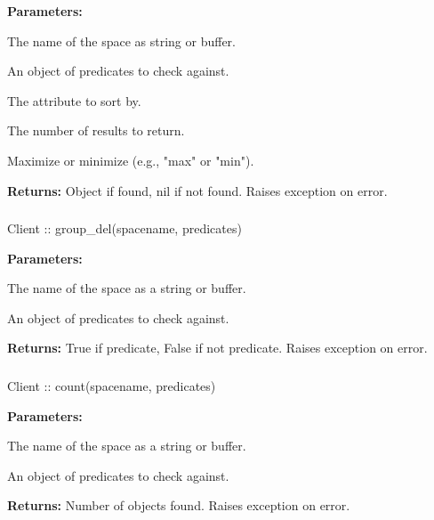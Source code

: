 \noindent\textbf{Parameters:}
\begin{description}[labelindent=\widthof{{\code{predicates}}},leftmargin=*,noitemsep,nolistsep,align=right]
\item[\code{spacename}] The name of the space as string or buffer.
\item[\code{predicates}] An object of predicates to check against.
\item[\code{sortby}] The attribute to sort by.
\item[\code{limit}] The number of results to return.
\item[\code{maxmin}] Maximize or minimize (e.g., "max" or "min").
\end{description}

\noindent\textbf{Returns:}
Object if found, nil if not found.  Raises exception on error.

\subsubsection{}
\label{api:nodejs:group_del}
\begin{javascriptcode}
Client :: group_del(spacename, predicates)
\end{javascriptcode}


\noindent\textbf{Parameters:}
\begin{description}[labelindent=\widthof{{\code{predicates}}},leftmargin=*,noitemsep,nolistsep,align=right]
\item[\code{spacename}] The name of the space as a string or buffer.
\item[\code{predicates}] An object of predicates to check against.
\end{description}

\noindent\textbf{Returns:}
True if predicate, False if not predicate.  Raises exception on error.

\subsubsection{}
\label{api:nodejs:count}
\begin{javascriptcode}
Client :: count(spacename, predicates)
\end{javascriptcode}


\noindent\textbf{Parameters:}
\begin{description}[labelindent=\widthof{{\code{predicates}}},leftmargin=*,noitemsep,nolistsep,align=right]
\item[\code{spacename}] The name of the space as a string or buffer.
\item[\code{predicates}] An object of predicates to check against.
\end{description}

\noindent\textbf{Returns:}
Number of objects found.  Raises exception on error.
